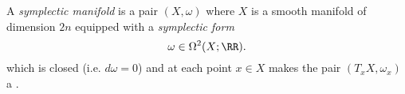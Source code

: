 
 
 A \emph{symplectic manifold} is a pair $(X,  \omega)$ where $X$ is a smooth manifold of dimension $2n$ equipped with a \emph{symplectic form} 
\[\omega\in \Omega^2(X; \RR).\]
which is closed (i.e. \(d\omega=0\)) and at each point $x\in X$ makes the pair $(T_xX, \omega_x)$ a .

 